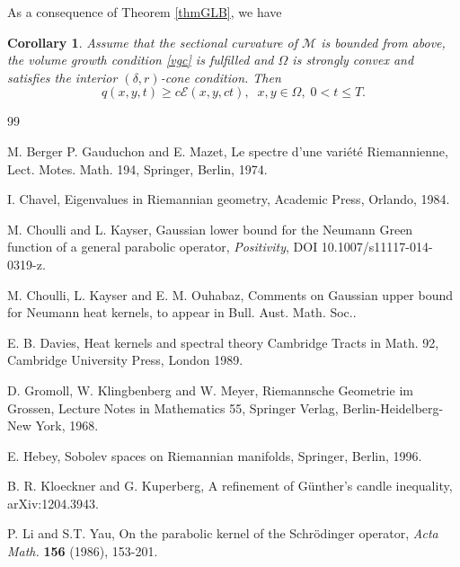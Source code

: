\documentclass{birkjour}
\newtheorem{corollary}{Corollary}[section]
\begin{document}
\smallskip
As a consequence of Theorem \ref{thmGLB}, we have
\begin{corollary}\label{thmGLB2}
Assume that the sectional curvature of $\mathcal{M}$ is bounded from above,  the volume growth condition \eqref{vgc} is fulfilled and $\Omega$ is strongly convex and satisfies the interior $(\delta ,r)$-cone condition. Then
\begin{equation}\label{e10}
q(x,y,t)\geq c\mathscr{E}(x,y,ct), \;\; x,y\in \Omega ,\; 0<t\leq T.
\end{equation}
\end{corollary}


\begin{thebibliography}{99}


\newblock M. Berger P. Gauduchon and E. Mazet,
\newblock Le spectre d'une vari\'et\'e Riemannienne, 
\newblock Lect. Motes. Math. 194, Springer, Berlin, 1974.

\newblock I. Chavel,
\newblock Eigenvalues in Riemannian geometry,
\newblock Academic Press, Orlando, 1984.


\newblock M. Choulli and L. Kayser,
\newblock Gaussian lower bound for the Neumann Green function of a general parabolic operator, 
\newblock \emph{Positivity}, DOI 10.1007/s11117-014-0319-z.

\newblock M. Choulli, L. Kayser and E. M. Ouhabaz,
\newblock Comments on Gaussian upper bound for Neumann heat kernels,
\newblock to appear in Bull. Aust. Math. Soc..

\newblock E. B. Davies,
\newblock Heat kernels and spectral theory
\newblock Cambridge Tracts in Math. 92, Cambridge University Press, London 1989.
 
\newblock D. Gromoll, W. Klingbenberg and W. Meyer, 
\newblock Riemannsche Geometrie im Grossen, 
\newblock Lecture Notes in Mathematics 55, Springer Verlag, Berlin-Heidelberg-New York, 1968.

\newblock E. Hebey,
\newblock Sobolev spaces on Riemannian manifolds,
\newblock Springer, Berlin, 1996.

\newblock B. R. Kloeckner and G. Kuperberg,
\newblock A refinement of G\"unther's candle inequality, 
\newblock arXiv:1204.3943.

\newblock P. Li and S.T. Yau, 
\newblock On the parabolic kernel of the Schr\"odinger operator, 
\newblock \emph{Acta Math.} \textbf{156} (1986), 153-201.


\end{thebibliography}
\end{document}
